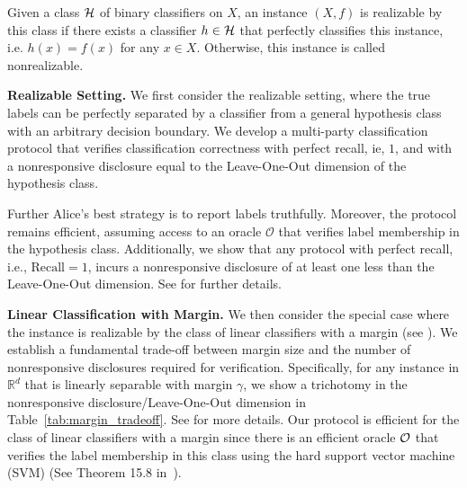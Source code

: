 Given a class $\mathcal{H}$ of binary classifiers on $X$, an instance $(X,f)$ is realizable by this class if there exists a classifier $h \in \mathcal{H}$ that perfectly classifies this instance, i.e. $h(x) = f(x)$ for any $x\in X$. Otherwise, this instance is called nonrealizable.

\textbf{Realizable Setting.} 
We first consider the realizable setting, where the true labels can be perfectly separated by a classifier from a general hypothesis class with an arbitrary decision boundary. We develop a multi-party classification protocol that verifies classification  correctness with perfect recall, ie, $1$, and with a nonresponsive disclosure equal to the Leave-One-Out dimension of the hypothesis class. 

Further Alice’s best strategy is to report labels truthfully. Moreover, the protocol remains efficient, assuming access to an oracle $\mathcal{O}$ that verifies label membership in the hypothesis class. 
Additionally, we show that any protocol with perfect recall, i.e., $\mathrm{Recall} = 1$, incurs a nonresponsive disclosure of at least one less than the Leave-One-Out dimension.
See  for further details.


\textbf{Linear Classification with Margin.}
We then consider the special case where the instance is realizable by the class of linear classifiers with a margin (see ).
We establish a fundamental trade-off between margin size and the number of nonresponsive disclosures required for verification. 
Specifically, for any instance in $\mathbb{R}^d$ that is linearly separable with margin $\gamma$, we show a trichotomy in the nonresponsive disclosure/Leave-One-Out dimension in Table~\ref{tab:margin_tradeoff}. See  for more details.
Our protocol is efficient for the class of linear classifiers with a margin since there is an efficient oracle $\mathcal{O}$ that verifies the label membership in this class using the hard support vector machine (SVM) (See Theorem 15.8 in~\citet*{shalev2014understanding}).


